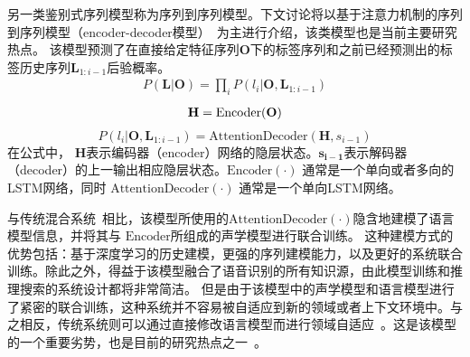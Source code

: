 另一类鉴别式序列模型称为序列到序列模型。下文讨论将以基于注意力机制的序列到序列模型（encoder-decoder模型）~\cite{chan2016end}为主进行介绍，该类模型也是当前主要研究热点。
该模型预测了在直接给定特征序列$\mathbf{O}$下的标签序列和之前已经预测出的标签历史序列$\mathbf{L}_{1:i-1}$后验概率。
\begin{equation}
\label{equ:enc-dec}
\begin{split}
P(\mathbf{L}|\mathbf{O})=\prod_i P(l_{i}|\mathbf{O},\mathbf{L}_{1:i-1})
\end{split}
\end{equation}
\begin{equation}
\label{equ:enc-dec-hid}
\begin{split}
\mathbf{H}&=\text{Encoder}(\mathbf{O})\\
\end{split}
\vspace{-0.3em}  
\end{equation}
\begin{equation}
\label{equ:enc-dec-dec}
P(l_{i}|\mathbf{O},\mathbf{L}_{1:i-1})=\text{AttentionDecoder}(\mathbf{H}, s_{i-1})
\end{equation}
在公式中， $\mathbf{H}$表示编码器（encoder）网络的隐层状态。$\mathbf{s_{i-1}}$表示解码器（decoder）的上一输出相应隐层状态。$\text{Encoder}(\cdot)$ 通常是一个单向或者多向的LSTM网络，同时 $\text{AttentionDecoder}(\cdot)$ 通常是一个单向LSTM网络。 %

与传统混合系统~\cite{hinton2012deep}相比，该模型所使用的$\text{AttentionDecoder}(\cdot)$隐含地建模了语言模型信息，并将其与 $\text{Encoder}$所组成的声学模型进行联合训练。
%
%
这种建模方式的优势包括：基于深度学习的历史建模，更强的序列建模能力，以及更好的系统联合训练。除此之外，得益于该模型融合了语音识别的所有知识源，由此模型训练和推理搜索的系统设计都将非常简洁。
但是由于该模型中的声学模型和语言模型进行了紧密的联合训练，这种系统并不容易被自适应到新的领域或者上下文环境中。与之相反，传统系统则可以通过直接修改语言模型而进行领域自适应~\cite{mcgraw2016personalized}。这是该模型的一个重要劣势，也是目前的研究热点之一~\cite{zhc00-chen-icassp19}。 

